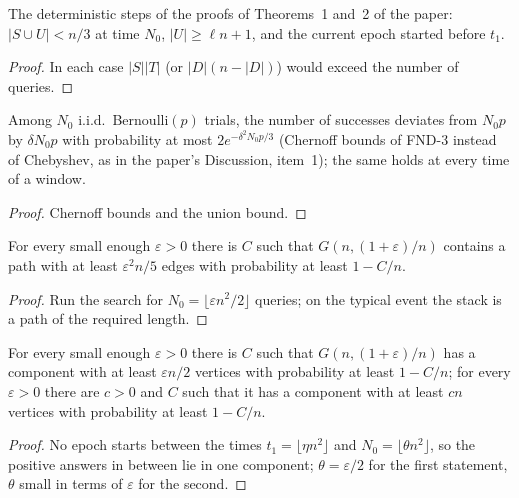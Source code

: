 \begin{lemma}\label{lem:analysis}
\leanok{}
The deterministic steps of the proofs of Theorems~1 and~2 of the paper: $|S\cup U|<n/3$ at time
$N_0$, $|U|\ge \ell n+1$, and the current epoch started before $t_1$.
\end{lemma}
\begin{proof}\leanok
In each case $|S||T|$ (or $|D|(n-|D|)$) would exceed the number of queries.
\end{proof}

\begin{lemma}\label{lem:ks1}
\leanok
Among $N_0$ i.i.d.\ Bernoulli$(p)$ trials, the number of successes deviates from $N_0p$ by
$\delta N_0p$ with probability at most $2e^{-\delta^2N_0p/3}$ (Chernoff bounds of FND-3 instead of
Chebyshev, as in the paper's Discussion, item~1); the same holds at every time of a window.
\end{lemma}
\begin{proof}\leanok
Chernoff bounds and the union bound.
\end{proof}

\begin{theorem}\label{thm:path}
\leanok{}
For every small enough $\varepsilon>0$ there is $C$ such that $G(n,(1+\varepsilon)/n)$ contains a
path with at least $\varepsilon^2n/5$ edges with probability at least $1-C/n$.
\end{theorem}
\begin{proof}\leanok
Run the search for $N_0=\lfloor\varepsilon n^2/2\rfloor$ queries; on the typical event the stack is
a path of the required length.
\end{proof}

\begin{theorem}\label{thm:giant}
\leanok{}
For every small enough $\varepsilon>0$ there is $C$ such that $G(n,(1+\varepsilon)/n)$ has a
component with at least $\varepsilon n/2$ vertices with probability at least $1-C/n$; for every
$\varepsilon>0$ there are $c>0$ and $C$ such that it has a component with at least $cn$ vertices
with probability at least $1-C/n$.
\end{theorem}
\begin{proof}\leanok
No epoch starts between the times $t_1=\lfloor\eta n^2\rfloor$ and $N_0=\lfloor\theta n^2\rfloor$,
so the positive answers in between lie in one component; $\theta=\varepsilon/2$ for the first
statement, $\theta$ small in terms of $\varepsilon$ for the second.
\end{proof}

